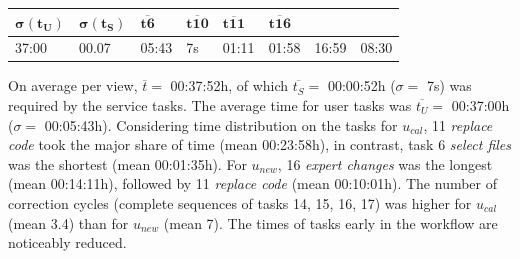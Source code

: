 \begin{longtable}[hbt]{@{}llllllll}
\begin{minipage}[b]{0.07\columnwidth}
\(\bm{\sigma(t_U)}\)\strut
\end{minipage} & \begin{minipage}[b]{0.07\columnwidth}\raggedright
\(\bm{\sigma(t_S)}\)\strut
\end{minipage} & \begin{minipage}[b]{0.07\columnwidth}\raggedright
\(\bm{\overline{t6}}\)\strut
\end{minipage} & \begin{minipage}[b]{0.07\columnwidth}\raggedright
\(\bm{\overline{t10}}\)\strut
\end{minipage} & \begin{minipage}[b]{0.07\columnwidth}\raggedright
\(\bm{\overline{t11}}\)\strut
\end{minipage} & \begin{minipage}[b]{0.07\columnwidth}\raggedright
\(\bm{\overline{t16}}\)\strut
\end{minipage}\tabularnewline
\midrule
\endhead
\begin{minipage}[t]{0.07\columnwidth}\raggedright
37:00\strut
\end{minipage} & \begin{minipage}[t]{0.07\columnwidth}\raggedright
00.07\strut
\end{minipage} & \begin{minipage}[t]{0.07\columnwidth}\raggedright
05:43\strut
\end{minipage} & \begin{minipage}[t]{0.07\columnwidth}\raggedright
7s\strut
\end{minipage} & \begin{minipage}[t]{0.07\columnwidth}\raggedright
01:11\strut
\end{minipage} & \begin{minipage}[t]{0.07\columnwidth}\raggedright
01:58\strut
\end{minipage} & \begin{minipage}[t]{0.07\columnwidth}\raggedright
16:59\strut
\end{minipage} & \begin{minipage}[t]{0.07\columnwidth}\raggedright
08:30\strut
\end{minipage}\tabularnewline
\bottomrule
\end{longtable}

On average per view, \(\overline{t}=\) 00:37:52h, of which \(\overline{t_S}=\) 00:00:52h (\(\sigma =\) 7s) was required by the service tasks.
The average time for user tasks was \(\overline{t_U}=\) 00:37:00h (\(\sigma =\) 00:05:43h).
Considering time distribution on the tasks for \(u_{cal}\), 11 \emph{replace code} took the major share of time (mean 00:23:58h), in contrast, task 6 \emph{select files} was the shortest (mean 00:01:35h).
For \(u_{new}\), 16 \emph{expert changes} was the longest (mean 00:14:11h), followed by 11 \emph{replace code} (mean 00:10:01h).
The number of correction cycles (complete sequences of tasks 14, 15, 16, 17) was higher for \(u_{cal}\) (mean 3.4) than for \(u_{new}\) (mean 7).
The times of tasks early in the workflow are noticeably reduced.


